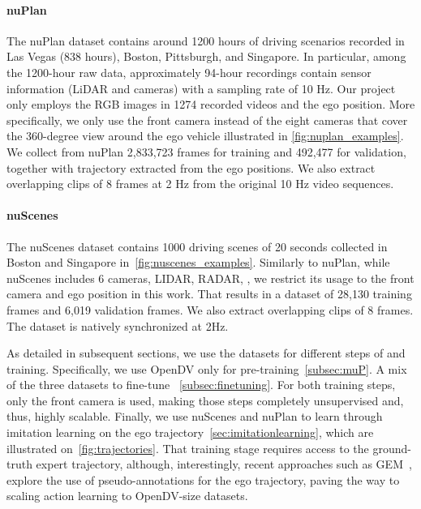\noindent\paragraph{nuPlan~\cite{caesar2021nuplan}} The nuPlan dataset contains around 1200 hours of driving scenarios recorded in Las Vegas (838 hours), Boston, Pittsburgh, and Singapore. In particular, among the 1200-hour raw data, approximately 94-hour recordings contain sensor information (LiDAR and cameras) with a sampling rate of 10 Hz. Our project only employs the RGB images in 1274 recorded videos and the ego position. More specifically, we only use the front camera instead of the eight cameras that cover the 360-degree view around the ego vehicle illustrated in \autoref{fig:nuplan_examples}. We collect from nuPlan 2,833,723 frames for training and 492,477 for validation, together with trajectory extracted from the ego positions. We also extract overlapping clips of 8 frames at 2 Hz from the original 10 Hz video sequences.

\noindent\paragraph{nuScenes~\cite{caesar2020nuscenes}} The nuScenes dataset contains 1000 driving scenes of 20 seconds collected in Boston and Singapore in~\autoref{fig:nuscenes_examples}. Similarly to nuPlan, while nuScenes includes 6 cameras, LIDAR, RADAR, \etc, we restrict its usage to the front camera and ego position in this work. That results in a dataset of 28,130 training frames and 6,019 validation frames. We also extract overlapping clips of 8 frames. The dataset is natively synchronized at 2Hz.

As detailed in subsequent sections, we use the datasets for different steps of \vm and \vam training. Specifically, we use OpenDV only for \vm pre-training~\autoref{subsec:muP}. A mix of the three datasets to fine-tune \vm~\autoref{subsec:finetuning}. For both training steps, only the front camera is used, making those steps completely unsupervised and, thus, highly scalable. Finally, we use nuScenes and nuPlan to learn \vam through imitation learning on the ego trajectory~\autoref{sec:imitationlearning}, which are illustrated on~\autoref{fig:trajectories}. That training stage requires access to the ground-truth expert trajectory, although, interestingly, recent approaches such as GEM~\cite{hassan2024gem}, explore the use of pseudo-annotations for the ego trajectory, paving the way to scaling action learning to OpenDV-size datasets.


